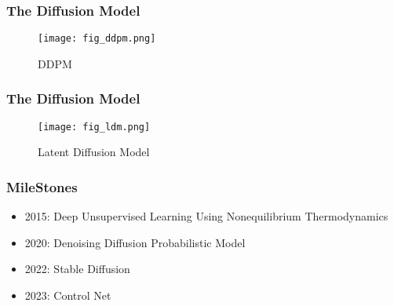 


\begin{frame}
    \frametitle{The Diffusion Model}
    \begin{figure}
        \texttt{[image: fig\_ddpm.png]}
        \caption{DDPM \cite{hoDenoisingDiffusionProbabilistic2020}}
    \end{figure}
\end{frame}

\begin{frame}
    \frametitle{The Diffusion Model}
    \begin{figure}
        \texttt{[image: fig\_ldm.png]}
        \caption{Latent Diffusion Model \cite{rombachHighResolutionImageSynthesis2022}}
    \end{figure}
\end{frame}

\begin{frame}
    \frametitle{MileStones}
    \begin{itemize}
        \item 2015: Deep Unsupervised Learning Using Nonequilibrium Thermodynamics \cite{sohl-dicksteinDeepUnsupervisedLearning2015}
        \item 2020: Denoising Diffusion Probabilistic Model \cite{hoDenoisingDiffusionProbabilistic2020}
        \item 2022: Stable Diffusion \cite{rombachHighResolutionImageSynthesis2022}
        \item 2023: Control Net \cite{zhangAddingConditionalControl2023}
    \end{itemize}
\end{frame}

